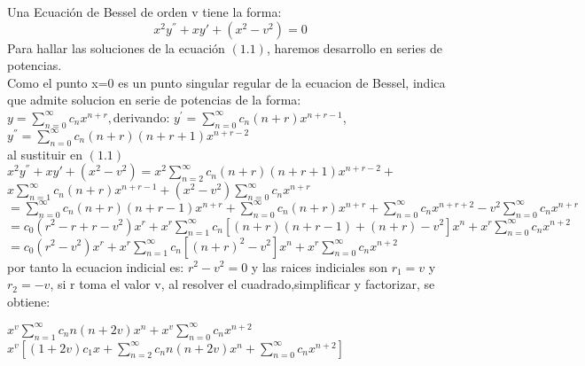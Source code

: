 \documentclass[12pt]{report}
\begin{document}
Una Ecuaci\'on de Bessel de orden v tiene la forma:
\begin{equation}
x^{2}y^{''}+xy{'}+(x^{2}-v^{2})=0
\end{equation}
Para hallar las soluciones de la ecuaci\'on $(1.1)$, haremos desarrollo en series de potencias.\\
Como el punto x=0 es un punto singular regular de la ecuacion de Bessel, indica que admite solucion en serie de potencias de la forma:\\
\vspace{0.3 cm}
$y=\sum_{n=0}^{\infty}c_{n}x^{n+r},$derivando: $y^{'}=\sum_{n=0}^{\infty}c_{n}(n+r)x^{n+r-1}$,\\
\vspace{0.3 cm}
$y^{''}=\sum_{n=0}^{\infty}c_{n}(n+r)(n+r+1)x^{n+r-2}$ \\
\vspace{0.3 cm}
al sustituir en $(1.1)$\\
\vspace{0.3 cm}
$x^{2}y^{''}+xy{'}+(x^{2}-v^{2})=x^{2}\sum_{n=2}^{\infty}c_{n}(n+r)(n+r+1)x^{n+r-2}+$\\$x\sum_{n=1}^{\infty}c_{n}(n+r)x^{n+r-1}+(x^{2}-v^{2})\sum_{n=0}^{\infty}c_{n}x^{n+r}$\\
\vspace{0.3 cm}
$=\sum_{n=0}^{\infty}c_{n}(n+r)(n+r-1)x^{n+r}+\sum_{n=0}^{\infty}c_{n}(n+r)x^{n+r}+\sum_{n=0}^{\infty}c_{n}x^{n+r+2}-v^{2}\sum_{n=0}^{\infty}c_{n}x^{n+r}$\\
\vspace{0.3 cm}
$=c_{0}(r^{2}-r+r-v^{2})x^{r}+x^{r}\sum_{n=1}^{\infty}c_{n}[(n+r)(n+r-1)+(n+r)-v^{2}]x^{n}+x^{r}\sum_{n=0}^{\infty}c_{n}x^{n+2}$\\
\vspace{0.3 cm}
$=c_{0}(r^{2}-v^{2})x^{r}+x^{r}\sum_{n=1}^{\infty}c_{n}[(n+r)^{2}-v^{2}]x^{n}+x^{r}\sum_{n=0}^{\infty}c_{n}x^{n+2}$\\
\vspace{0.3 cm}
por tanto la ecuacion indicial es: $r^{2}-v^{2}=0$ y las raices indiciales son $r_{1}=v$ y $r_{2}=-v$, si r toma el valor v,
al resolver el cuadrado,simplificar y factorizar, se obtiene:\\
\begin{center}
$x^{v}\sum_{n=1}^{\infty}c_{n}n(n+2v)x^{n}+x^{v}\sum_{n=0}^{\infty}c_{n}x^{n+2}$\vspace{0,5cm}
$x^{v}[(1+2v)c_{1}x+\sum_{n=2}^{\infty}c_{n}n(n+2v)x^{n}+\sum_{n=0}^{\infty}c_{n}x^{n+2}]$
\end{center}
\end{document}

